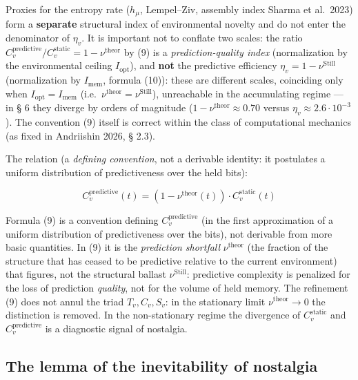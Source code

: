 \documentclass[pdflatex,sn-mathphys-ay]{sn-jnl}
\begin{document}
Proxies for the entropy rate (\(h_\mu\), Lempel--Ziv, assembly index Sharma et al.~2023) form a \textbf{separate} structural index of environmental novelty and do not enter the denominator of \(\eta_v\). It is important not to conflate two scales: the ratio \(C_v^{\text{predictive}}/C_v^{\text{static}} = 1 - \nu^{\text{theor}}\) by (9) is a \emph{prediction-quality index} (normalization by the environmental ceiling \(I_{\text{opt}}\)), and \textbf{not} the predictive efficiency \(\eta_v = 1 - \nu^{\text{Still}}\) (normalization by \(I_{\text{mem}}\), formula (10)): these are different scales, coinciding only when \(I_{\text{opt}} = I_{\text{mem}}\) (i.e.~\(\nu^{\text{theor}} = \nu^{\text{Still}}\)), unreachable in the accumulating regime --- in § 6 they diverge by orders of magnitude (\(1 - \nu^{\text{theor}} \approx 0.70\) versus \(\eta_v \approx 2.6\cdot10^{-3}\)). The convention (9) itself is correct within the class of computational mechanics (as fixed in Andriishin 2026, § 2.3).



The relation (a \emph{defining convention}, not a derivable identity: it postulates a uniform distribution of predictiveness over the held bits):



\begin{equation}C_v^{\text{predictive}}(t) = (1 - \nu^{\text{theor}}(t)) \cdot C_v^{\text{static}}(t) \tag{9}\end{equation}



Formula (9) is a convention defining \(C_v^{\text{predictive}}\) (in the first approximation of a uniform distribution of predictiveness over the bits), not derivable from more basic quantities. In (9) it is the \emph{prediction shortfall} \(\nu^{\text{theor}}\) (the fraction of the structure that has ceased to be predictive relative to the current environment) that figures, not the structural ballast \(\nu^{\text{Still}}\): predictive complexity is penalized for the loss of prediction \emph{quality}, not for the volume of held memory. The refinement (9) does not annul the triad \(T_v, C_v, S_v\): in the stationary limit \(\nu^{\text{theor}} \to 0\) the distinction is removed. In the non-stationary regime the divergence of \(C_v^{\text{static}}\) and \(C_v^{\text{predictive}}\) is a diagnostic signal of nostalgia.



\subsection{The lemma of the inevitability of nostalgia}\label{the-lemma-of-the-inevitability-of-nostalgia}
\end{document}
